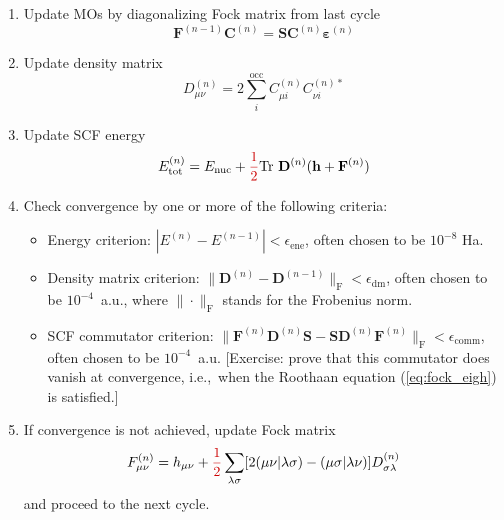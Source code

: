 \documentclass[parskip=full]{article}
\newcommand{\myred}[1]{\textcolor{myred}{#1}}
\begin{document}
\begin{enumerate}
        \begin{enumerate}
            \item Update MOs by diagonalizing Fock matrix from last cycle
            \begin{equation}    \label{eq:fock_eigh}
                \mathbf{F}^{(n-1)} \mathbf{C}^{(n)}
                    = \mathbf{S} \mathbf{C}^{(n)} \bm{\varepsilon}^{(n)}
            \end{equation}
            \item Update density matrix
            \begin{equation}
                D^{(n)}_{\mu\nu}
                    = 2 \sum_{i}^{\textrm{occ}} C^{(n)}_{\mu i} C^{(n)*}_{\nu i}
            \end{equation}
            \item Update SCF energy
            \begin{equation}    \label{eq:scf_energy}
                E^{(n)}_{\textrm{tot}}
                    = E_{\textrm{nuc}} + \myred{\frac{1}{2}}
                    \mathrm{Tr}~\mathbf{D}^{(n)} (\mathbf{h} + \mathbf{F}^{(n)})
            \end{equation}
            \item Check convergence by one or more of the following criteria:
            \begin{itemize}
                \item Energy criterion: $|E^{(n)} - E^{(n-1)}| < \epsilon_{\textrm{ene}}$, often chosen to be $10^{-8}$ Ha.
                \item Density matrix criterion: $\|\mathbf{D}^{(n)} - \mathbf{D}^{(n-1)}\|_{\textrm{F}} < \epsilon_{\textrm{dm}}$, often chosen to be $10^{-4}$~a.u., where $\|\cdot\|_{\textrm{F}}$ stands for the Frobenius norm.
                \item SCF commutator criterion: $\|\mathbf{F}^{(n)}\mathbf{D}^{(n)}\mathbf{S} - \mathbf{S}\mathbf{D}^{(n)}\mathbf{F}^{(n)}\|_{\textrm{F}} < \epsilon_{\textrm{comm}}$, often chosen to be $10^{-4}$~a.u.
                [Exercise: prove that this commutator does vanish at convergence, i.e.,~when the Roothaan equation (\ref{eq:fock_eigh}) is satisfied.]
            \end{itemize}
            \item If convergence is not achieved, update Fock matrix
            \begin{equation}    \label{eq:fock_build}
                F^{(n)}_{\mu\nu}
                    = h_{\mu\nu} + \myred{\frac{1}{2}}
                    \sum_{\lambda\sigma} [2 (\mu\nu|\lambda\sigma) - (\mu\sigma|\lambda\nu)] D^{(n)}_{\sigma\lambda}
            \end{equation}
            and proceed to the next cycle.
        \end{enumerate}
    \end{enumerate}
\end{document}
